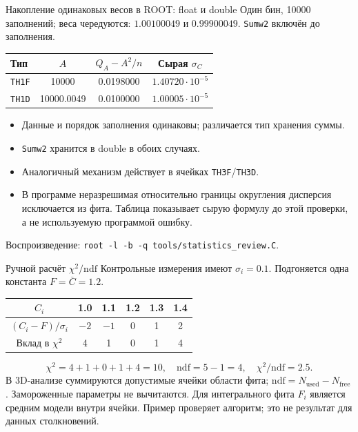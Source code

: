 \begin{frame}{Накопление одинаковых весов в ROOT: float и double}
    \small
    Один бин, 10000 заполнений; веса чередуются:
    $1.00100049$ и $0.99900049$. \texttt{Sumw2} включён до заполнения.
    \begin{center}
        \begin{tabular}{l|c|c|c}
            Тип & $A$ & $Q_A-A^2/n$ & Сырая $\sigma_C$\\ \hline
            \texttt{TH1F} & 10000 & 0.0198000 & $1.40720\cdot10^{-5}$\\
            \texttt{TH1D} & 10000.0049 & 0.0100000 & $1.00005\cdot10^{-5}$
        \end{tabular}
    \end{center}
    \begin{itemize}
        \item Данные и порядок заполнения одинаковы; различается тип хранения суммы.
        \item \texttt{Sumw2} хранится в double в обоих случаях.
        \item Аналогичный механизм действует в ячейках \texttt{TH3F}/\texttt{TH3D}.
        \item В программе неразрешимая относительно границы округления
              дисперсия исключается из фита. Таблица показывает сырую формулу
              до этой проверки, а не используемую программой ошибку.
    \end{itemize}
    Воспроизведение: \texttt{root -l -b -q tools/statistics\_review.C}.
\end{frame}

\begin{frame}{Ручной расчёт $\chi^2/\mathrm{ndf}$}
    \small
    Контрольные измерения имеют $\sigma_i=0.1$.
    Подгоняется одна константа $F=\overline C=1.2$.
    \begin{center}
        \begin{tabular}{c|ccccc}
            $C_i$ & 1.0 & 1.1 & 1.2 & 1.3 & 1.4\\ \hline
            $(C_i-F)/\sigma_i$ & $-2$ & $-1$ & 0 & 1 & 2\\
            Вклад в $\chi^2$ & 4 & 1 & 0 & 1 & 4
        \end{tabular}
    \end{center}
    \[
        \chi^2=4+1+0+1+4=10,\quad
        \mathrm{ndf}=5-1=4,\quad \chi^2/\mathrm{ndf}=2.5.
    \]
    В 3D-анализе суммируются допустимые ячейки области фита;
    $\mathrm{ndf}=N_{\mathrm{used}}-N_{\mathrm{free}}$.
    Замороженные параметры не вычитаются. Для интегрального фита
    $F_i$ является средним модели внутри ячейки.
    Пример проверяет алгоритм; это не результат для данных столкновений.
\end{frame}
